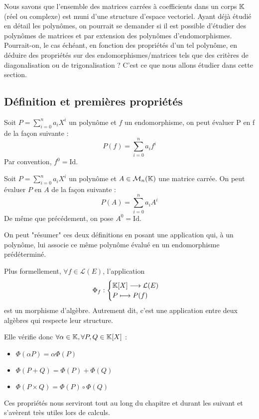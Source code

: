 Nous savons que l'ensemble des matrices carrées à coefficients dans un corps $\mathbb{K}$ (réel ou complexe) est 
muni d'une structure d'espace vectoriel. 
Ayant déjà étudié en détail les polynômes, on pourrait se demander si il est possible d'étudier des polynômes de matrices 
et par extension des polynômes d'endomorphismes. 
Pourrait-on, le cas échéant, en fonction des propriétés d'un tel polynôme, en déduire des propriétés sur des endomorphismes/matrices 
tels que des critères de diagonalisation ou de trigonalisation ?
C'est ce que nous allons étudier dans cette section. 

\subsection{Définition et premières propriétés}

\begin{definition}
    Soit $P = \sum_{i=0}^{n} a_i X^i$ un polynôme et $f$ un endomorphisme, on peut évaluer P en f de la façon suivante :
        \[ P(f) = \sum_{i=0}^{n} a_i f^i \]
    Par convention, $f^0 = \text{Id}$. 
\end{definition}

\begin{definition}
    Soit $P = \sum_{i=0}^{n} a_i X^i$ un polynôme et $A \in \mathcal{M}_n(\mathbb{K})$ une matrice carrée. 
    On peut évaluer $P$ en $A$ de la façon suivante :
        \[P(A) = \sum_{i=0}^{n} a_i A^i\]
    De même que précédement, on pose $A^0 = \text{Id}$.
\end{definition}


\begin{proposition}
    On peut "résumer" ces deux définitions en posant une application qui, à un polynôme, lui associe ce même polynôme évalué 
    en un endomorphisme prédéterminé. 

    Plus formellement, $ \forall f \in \mathcal{L}(E)$, l'application 
        \[ \Phi_f : 
            \begin{cases}
                \mathbb{K}[X] \longrightarrow \mathcal{L}(E) \\ 
                P \longmapsto P(f)
            \end{cases}
        \]
    est un morphisme d'algèbre. Autrement dit, c'est une application entre deux algèbres qui respecte leur structure. 
    
    Elle vérifie donc $ \forall \alpha \in \mathbb{K}, \forall P,Q \in \mathbb{K}[X]$ :
    \begin{itemize}
        \item $\Phi(\alpha P) = \alpha \Phi(P)$ 
        \item $\Phi(P+Q) = \Phi(P) + \Phi(Q)$ 
        \item $\Phi(P \times Q) = \Phi(P) \circ \Phi(Q)$ 
    \end{itemize}
    Ces propriétés nous serviront tout au long du chapitre et durant les suivant et s'avèrent très utiles lors de calculs. 
\end{proposition}

